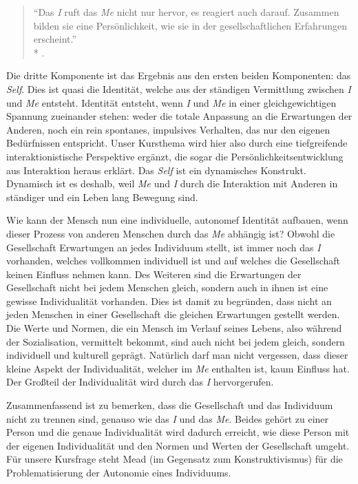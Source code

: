 \begin{quote}
	``Das \emph{I} ruft das \emph{Me} nicht nur hervor, es reagiert auch darauf.
	Zusammen bilden sie eine Persönlichkeit, wie sie in der gesellschaftlichen Erfahrungen erscheint.''\\*
	\parencite[221]{mead-1934en}.
\end{quote}

Die dritte Komponente ist das Ergebnis aus den ersten beiden Komponenten: das \emph{Self}.
Dies ist quasi die Identität, welche aus der ständigen Vermittlung zwischen \emph{I} und \emph{Me} entsteht.
Identität entsteht, wenn \emph{I} und \emph{Me} in einer gleichgewichtigen Spannung zueinander stehen:
weder die totale Anpassung an die Erwartungen der Anderen, noch ein rein spontanes, impulsives Verhalten, das nur den eigenen Bedürfnissen entspricht.
Unser Kursthema wird hier also durch eine tiefgreifende interaktionistische Perspektive ergänzt, die sogar die Persönlichkeitsentwicklung aus Interaktion heraus erklärt.
Das \emph{Self} ist ein dynamisches Konstrukt.
Dynamisch ist es deshalb, weil \emph{Me} und \emph{I} durch die Interaktion mit Anderen in ständiger und ein Leben lang Bewegung sind.

Wie kann der Mensch nun eine individuelle, autonomef Identität aufbauen, wenn dieser Prozess von anderen Menschen durch das \emph{Me} abhängig ist?
Obwohl die Gesellschaft Erwartungen an jedes Individuum stellt, ist immer noch das \emph{I} vorhanden, welches vollkommen individuell ist und auf welches die Gesellschaft keinen Einfluss nehmen kann.
Des Weiteren sind die Erwartungen der Gesellschaft nicht bei jedem Menschen gleich, sondern auch in ihnen ist eine gewisse Individualität vorhanden.
Dies ist damit zu begründen, dass nicht an jeden Menschen in einer Gesellschaft die gleichen Erwartungen gestellt werden.
Die Werte und Normen, die ein Mensch im Verlauf seines Lebens, also während der Sozialisation, vermittelt bekommt, sind auch nicht bei jedem gleich, sondern individuell und kulturell geprägt.
Natürlich darf man nicht vergessen, dass dieser kleine Aspekt der Individualität, welcher im \emph{Me} enthalten ist, kaum Einfluss hat.
Der Großteil der Individualität wird durch das \emph{I} hervorgerufen.

Zusammenfassend ist zu bemerken, dass die Gesellschaft und das Individuum nicht zu trennen sind, genauso wie das \emph{I} und das \emph{Me}.
Beides gehört zu einer Person und die genaue Individualität wird dadurch erreicht, wie diese Person mit der eigenen Individualität und den Normen und Werten der Gesellschaft umgeht.
Für unsere Kursfrage steht Mead (im Gegensatz zum Konstruktivismus) für die Problematisierung der Autonomie eines Individuums.